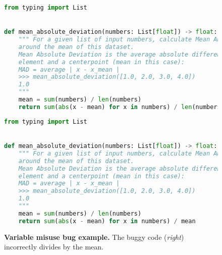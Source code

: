 \begin{figure}[htbp]
\centering
\begin{minipage}{0.45\textwidth}
\begin{lstlisting}[language=Python,breaklines=true,basicstyle=\ttfamily\scriptsize]
from typing import List


def mean_absolute_deviation(numbers: List[float]) -> float:
    """ For a given list of input numbers, calculate Mean Absolute Deviation
    around the mean of this dataset.
    Mean Absolute Deviation is the average absolute difference between each
    element and a centerpoint (mean in this case):
    MAD = average | x - x_mean |
    >>> mean_absolute_deviation([1.0, 2.0, 3.0, 4.0])
    1.0
    """
    mean = sum(numbers) / len(numbers)
    return sum(abs(x - mean) for x in numbers) / len(numbers)
\end{lstlisting}
\end{minipage}\hfill
\begin{minipage}{0.45\textwidth}
\begin{lstlisting}[language=Python,breaklines=true,basicstyle=\ttfamily\scriptsize]
from typing import List


def mean_absolute_deviation(numbers: List[float]) -> float:
    """ For a given list of input numbers, calculate Mean Absolute Deviation
    around the mean of this dataset.
    Mean Absolute Deviation is the average absolute difference between each
    element and a centerpoint (mean in this case):
    MAD = average | x - x_mean |
    >>> mean_absolute_deviation([1.0, 2.0, 3.0, 4.0])
    1.0
    """
    mean = sum(numbers) / len(numbers)
    return sum(abs(x - mean) for x in numbers) / mean
\end{lstlisting}
\end{minipage}
\caption{\textbf{Variable misuse bug example.} The buggy code (\emph{right}) incorrectly divides by the mean.}
\label{fig:variablemisuse}
\end{figure}


